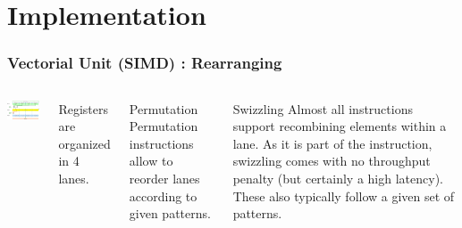 \documentclass{beamer}
\begin{document}
\section{Implementation}

\begin{frame}
  \frametitle{Vectorial Unit (SIMD) : Rearranging}

  \begin{columns}

    \includegraphics[width=15em]{slides-figures/vect-swizzling.png}%
    
    
    Registers are organized in 4 lanes.

    \begin{block}{Permutation}
      Permutation instructions allow to reorder lanes according to
      given patterns.
    \end{block}
    
    \begin{block}{Swizzling}
      Almost all instructions support recombining elements within a
      lane. As it is part of the instruction, swizzling comes with no
      throughput penalty (but certainly a high latency). These also
      typically follow a given set of patterns.
    \end{block}
  \end{columns}
\end{frame}
\end{document}

